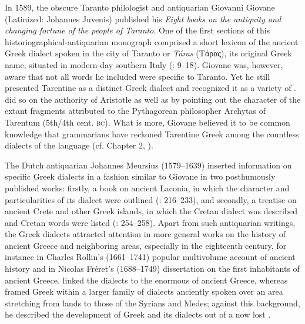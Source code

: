 In 1589, the obscure Taranto philologist and antiquarian Giovanni Giovane (Latinized: Johannes Juvenis) published his \textit{Eight books on the antiquity and changing fortune of the people of Taranto}. One of the first sections of this historiographical-antiquarian monograph comprised a short lexicon of the ancient Greek dialect spoken in the city of Taranto or \textit{Táras} (Tάρας), its original Greek name, situated in modern-day southern Italy (\citealt{Giovane1589}: 9–18). Giovane was, however, aware that not all words he included were specific to Taranto. Yet he still presented Tarentine as a distinct Greek dialect and recognized it as a variety of . \citet[8--9]{Giovane1589} did so on the authority of Aristotle as well as by pointing out the  character of the extant fragments attributed to the Pythagorean philosopher Archytas of Tarentum (5th/4th cent. \textsc{bc}). What is more, Giovane believed it to be common knowledge that grammarians have reckoned Tarentine Greek among the countless dialects of the language (cf. Chapter 2, ).

The Dutch antiquarian Johannes Meursius (1579–1639) inserted information on specific Greek dialects in a fashion similar to Giovane in two posthumously published works: firstly, a book on ancient Laconia, in which the  character and particularities of its dialect were outlined (\citealt{Meursius1661}: 216–233), and secondly, a treatise on ancient Crete and other Greek islands, in which the  Cretan dialect was described and Cretan words were listed (\citealt{Meursius1675}: 254–258). Apart from such antiquarian writings, the Greek dialects attracted attention in more general works on the history of ancient Greece and neighboring areas, especially in the eighteenth century, for instance in Charles Rollin’s (1661–1741) popular multivolume account of ancient history and in Nicolas Fréret’s (1688–1749) dissertation on the first inhabitants of ancient Greece. \citet[395--396]{Rollin1731} linked the dialects to the enormous  of ancient Greece, whereas \citet[esp. 107--129]{Freret1809} framed Greek within a larger family of dialects anciently spoken over an area stretching from  lands to those of the Syrians and Medes; against this background, he described the development of Greek and its dialects out of a now lost .

